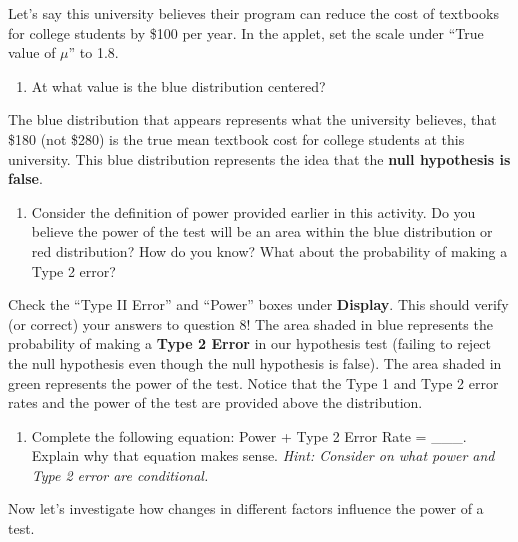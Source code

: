\documentclass[
]{report}
\providecommand{\tightlist}{%
  \setlength{\itemsep}{0pt}\setlength{\parskip}{0pt}}
\begin{document}
Let's say this university believes their program can reduce the cost of textbooks for college students by \$100 per year. In the applet, set the scale under ``True value of \(\mu\)'' to 1.8.

\begin{enumerate}
\def\labelenumi{\arabic{enumi}.}
\setcounter{enumi}{6}
\tightlist
\item
  At what value is the blue distribution centered?
  \vspace{0.2in}
\end{enumerate}

The blue distribution that appears represents what the university believes, that \$180 (not \$280) is the true mean textbook cost for college students at this university. This blue distribution represents the idea that the \textbf{null hypothesis is false}.

\begin{enumerate}
\def\labelenumi{\arabic{enumi}.}
\setcounter{enumi}{7}
\tightlist
\item
  Consider the definition of power provided earlier in this activity. Do you believe the power of the test will be an area within the blue distribution or red distribution? How do you know? What about the probability of making a Type 2 error?
  \vspace{0.6in}
\end{enumerate}

Check the ``Type II Error'' and ``Power'' boxes under \textbf{Display}. This should verify (or correct) your answers to question 8! The area shaded in blue represents the probability of making a \textbf{Type 2 Error} in our hypothesis test (failing to reject the null hypothesis even though the null hypothesis is false). The area shaded in green represents the power of the test. Notice that the Type 1 and Type 2 error rates and the power of the test are provided above the distribution.

\begin{enumerate}
\def\labelenumi{\arabic{enumi}.}
\setcounter{enumi}{8}
\tightlist
\item
  Complete the following equation: Power + Type 2 Error Rate = \_\_\_. Explain why that equation makes sense. \emph{Hint: Consider on what power and Type 2 error are conditional.}
  \vspace{0.6in}
\end{enumerate}

Now let's investigate how changes in different factors influence the power of a test.
\end{document}
